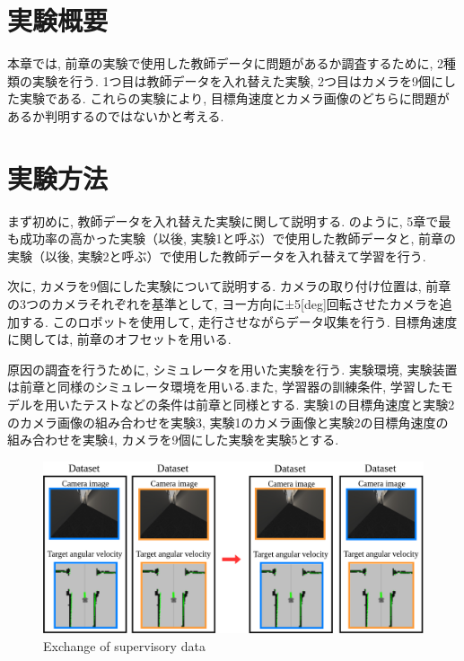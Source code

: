 
\section{実験概要}
本章では, 前章の実験で使用した教師データに問題があるか調査するために, 2種類の実験を行う. 1つ目は教師データを入れ替えた実験, 2つ目はカメラを9個にした実験である. 
これらの実験により, 目標角速度とカメラ画像のどちらに問題があるか判明するのではないかと考える. 

\section{実験方法}
まず初めに, 教師データを入れ替えた実験に関して説明する. のように, 5章で最も成功率の高かった実験（以後, 実験1と呼ぶ）で使用した教師データと, 前章の実験（以後, 実験2と呼ぶ）で使用した教師データを入れ替えて学習を行う.
\par 次に, カメラを9個にした実験について説明する. カメラの取り付け位置は, 前章の3つのカメラそれぞれを基準として, ヨー方向に±5[deg]回転させたカメラを追加する. このロボットを使用して, 走行させながらデータ収集を行う. 目標角速度に関しては, 前章のオフセットを用いる. 
\par 原因の調査を行うために, シミュレータを用いた実験を行う. 実験環境, 実験装置は前章と同様のシミュレータ環境を用いる.また, 学習器の訓練条件, 学習したモデルを用いたテストなどの条件は前章と同様とする. 実験1の目標角速度と実験2のカメラ画像の組み合わせを実験3, 実験1のカメラ画像と実験2の目標角速度の組み合わせを実験4, カメラを9個にした実験を実験5とする. 

\begin{figure}[h]
  \centering
  \includegraphics[keepaspectratio, scale=0.22]{images/change.png}
  \caption{Exchange of supervisory data}
  \label{Fig:change}
\end{figure}

\newpage
